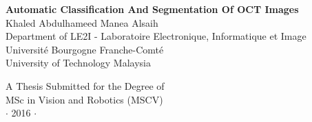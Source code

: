 

\newpage
\thispagestyle{empty}


\vspace*{2cm}
\begin{center}
{\Large\bf Automatic Classification And Segmentation Of OCT Images\\} \vspace{2cm} {\large
Khaled Abdulhameed Manea Alsaih\\
\vspace{2cm}
Department of LE2I - Laboratoire Electronique, Informatique et Image \\
Université Bourgogne Franche-Comté \\
University of Technology Malaysia }
\end{center}

\vspace{7cm}
\begin{center}
{\large A Thesis Submitted for the Degree of \\MSc
in Vision and Robotics (MSCV) \\\vspace{0.3cm} $\cdot$ 2016
$\cdot$}
\end{center}
\singlespacing


